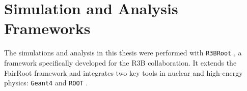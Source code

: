 






\section{Simulation and Analysis Frameworks}

The simulations and analysis in this thesis were performed with \texttt{R3BRoot} \cite{bertini_r3broot_2011}, a framework specifically developed for the \gls{R3B} collaboration. It extends the FairRoot framework \cite{al-turany_fairroot_2012} and integrates two key tools in nuclear and high-energy physics: \texttt{Geant4} \cite{agostinelli_geant4simulation_2003} and \texttt{ROOT} \cite{brun_root_1997}.  

